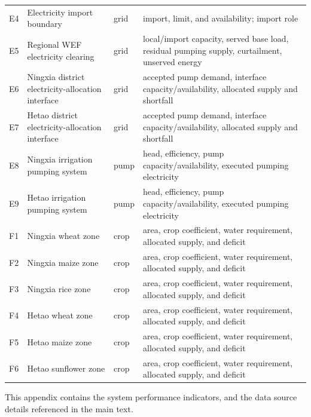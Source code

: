 \documentclass [a4paper,fleqn] {cas-dc}
\begin{document}
\begin{table}[pos=t]
\begin{tabularx}{\textwidth}{@{}l >{\raggedright\arraybackslash}p{} l
  >{\raggedright\arraybackslash}X@{}}
E4 & Electricity import boundary & grid & import, limit, and availability; import role \\
E5 & Regional WEF electricity clearing & grid & local/import capacity, served base load, residual pumping supply, curtailment, unserved energy \\
E6 & Ningxia district electricity-allocation interface & grid & accepted pump demand, interface capacity/availability, allocated supply and shortfall \\
E7 & Hetao district electricity-allocation interface & grid & accepted pump demand, interface capacity/availability, allocated supply and shortfall \\
E8 & Ningxia irrigation pumping system & pump & head, efficiency, pump capacity/availability, executed pumping electricity \\
E9 & Hetao irrigation pumping system & pump & head, efficiency, pump capacity/availability, executed pumping electricity \\
\midrule
F1 & Ningxia wheat zone & crop & area, crop coefficient, water requirement, allocated supply, and deficit \\
F2 & Ningxia maize zone & crop & area, crop coefficient, water requirement, allocated supply, and deficit \\
F3 & Ningxia rice zone & crop & area, crop coefficient, water requirement, allocated supply, and deficit \\
F4 & Hetao wheat zone & crop & area, crop coefficient, water requirement, allocated supply, and deficit \\
F5 & Hetao maize zone & crop & area, crop coefficient, water requirement, allocated supply, and deficit \\
F6 & Hetao sunflower zone & crop & area, crop coefficient, water requirement, allocated supply, and deficit \\
\bottomrule
\end{tabularx}
\end{table}
\FloatBarrier


This appendix contains the system performance indicators, and the data source details referenced in the main text.

\end{document}
